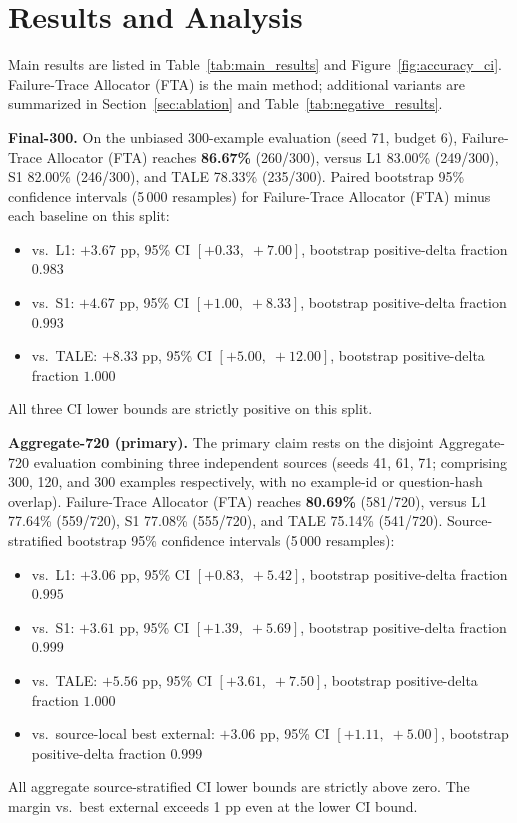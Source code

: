 \section{Results and Analysis}
\label{sec:results}

Main results are listed in Table~\ref{tab:main_results} and Figure~\ref{fig:accuracy_ci}.
Failure-Trace Allocator (FTA) is the main method; additional variants are summarized in Section~\ref{sec:ablation}
and Table~\ref{tab:negative_results}.

\medskip\noindent\textbf{Final-300.}
On the unbiased 300-example evaluation (seed 71, budget 6), Failure-Trace Allocator (FTA) reaches
\textbf{86.67\%} (260/300), versus L1 83.00\% (249/300), S1 82.00\% (246/300),
and TALE 78.33\% (235/300).
Paired bootstrap 95\% confidence intervals (5\,000 resamples) for Failure-Trace Allocator (FTA)
minus each baseline on this split:
\begin{itemize}[nosep,leftmargin=1.5em]
  \item vs.\ L1: $+3.67$ pp, 95\% CI $[+0.33,\;+7.00]$, bootstrap positive-delta fraction $0.983$
  \item vs.\ S1: $+4.67$ pp, 95\% CI $[+1.00,\;+8.33]$, bootstrap positive-delta fraction $0.993$
  \item vs.\ TALE: $+8.33$ pp, 95\% CI $[+5.00,\;+12.00]$, bootstrap positive-delta fraction $1.000$
\end{itemize}
All three CI lower bounds are strictly positive on this split.

\medskip\noindent\textbf{Aggregate-720 (primary).}
The primary claim rests on the disjoint Aggregate-720 evaluation combining three independent
sources (seeds 41, 61, 71; comprising 300, 120, and 300 examples respectively,
with no example-id or question-hash overlap).
Failure-Trace Allocator (FTA) reaches \textbf{80.69\%} (581/720), versus L1 77.64\% (559/720),
S1 77.08\% (555/720), and TALE 75.14\% (541/720).
Source-stratified bootstrap 95\% confidence intervals (5\,000 resamples):
\begin{itemize}[nosep,leftmargin=1.5em]
  \item vs.\ L1: $+3.06$ pp, 95\% CI $[+0.83,\;+5.42]$, bootstrap positive-delta fraction $0.995$
  \item vs.\ S1: $+3.61$ pp, 95\% CI $[+1.39,\;+5.69]$, bootstrap positive-delta fraction $0.999$
  \item vs.\ TALE: $+5.56$ pp, 95\% CI $[+3.61,\;+7.50]$, bootstrap positive-delta fraction $1.000$
  \item vs.\ source-local best external: $+3.06$ pp, 95\% CI $[+1.11,\;+5.00]$,
        bootstrap positive-delta fraction $0.999$
\end{itemize}
All aggregate source-stratified CI lower bounds are strictly above zero.
The margin vs.\ best external exceeds 1 pp even at the lower CI bound.

